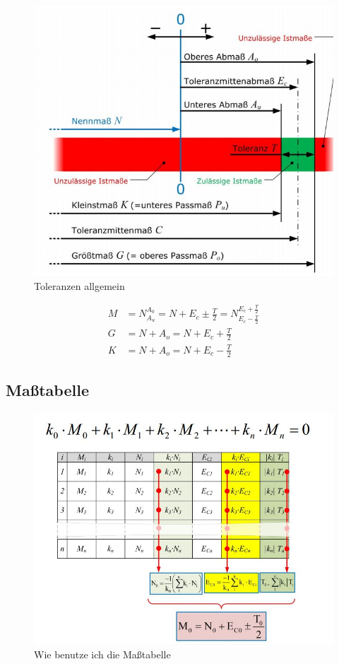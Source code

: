 \begin{figure}[h]
	\centering
	\includegraphics[scale=0.6]{Toleranzen_1.jpg}
	\caption{Toleranzen allgemein}
\end{figure}

\begin{align*}
M &= N^{A_0}_{A_u} = N + E_c \pm \frac{T}{2} = N^{E_c + \frac{T}{2}}_{E_c - \frac{T}{2}} \\
G &= N + A_o = N + E_c + \frac{T}{2} \\
K &= N + A_o = N + E_c - \frac{T}{2}
\end{align*}

\newpage

\subsection*{Maßtabelle}

\begin{figure}[h]
	\centering
	\includegraphics[scale=0.7]{Masstabelle.jpg}
	\caption{Wie benutze ich die Maßtabelle}
\end{figure}


